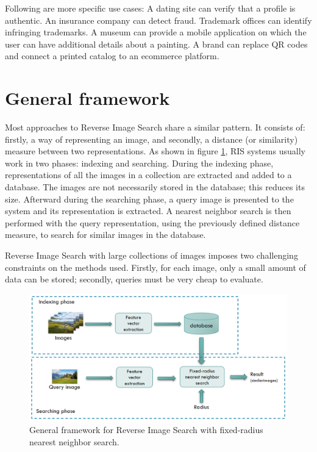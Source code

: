 Following are more specific use cases: A dating site can verify that a profile is authentic. An insurance company can detect fraud. Trademark offices can identify infringing trademarks. A museum can provide a mobile application on which the user can have additional details about a painting. A brand can replace QR codes and connect a printed catalog to an ecommerce platform.

\section{General framework}
Most approaches to Reverse Image Search share a similar pattern. It consists of: firstly, a way of representing an image, and secondly, a distance (or similarity) measure between two representations. As shown in figure \ref{fig:general_ris_framework}, RIS systems usually work in two phases: indexing and searching. During the indexing phase, representations of all the images in a collection are extracted and added to a database. The images are not necessarily stored in the database; this reduces its size. Afterward during the searching phase, a query image is presented to the system and its representation is extracted. A nearest neighbor search is then performed with the query representation, using the previously defined distance measure, to search for similar images in the database.

Reverse Image Search with large collections of images imposes two challenging constraints on the methods used. Firstly, for each image, only a small amount of data can be stored; secondly, queries must be very cheap to evaluate.

\begin{figure}
	\includegraphics[width=\textwidth]{img/general_ris_framework.png}
	\caption{General framework for Reverse Image Search with fixed-radius nearest neighbor search.}
	\label{fig:general_ris_framework}
\end{figure}

